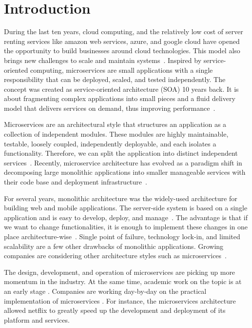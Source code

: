 
\section{Introduction}

During the last ten years, cloud computing, and the relatively low cost of server renting services like amazon web services, azure, and google cloud have opened the opportunity to build businesses around cloud technologies. This model also brings new challenges to scale and maintain systems~\cite{Claus2016}. Inspired by service-oriented computing, microservices are small applications with a single responsibility that can be deployed, scaled, and tested independently. The concept was created as service-oriented architecture (SOA) 10 years back. It is about fragmenting complex applications into small pieces and a fluid delivery model that delivers services on demand, thus improving performance~\cite{Larrucea2018}.

Microservices are an architectural style that structures an application as a collection of independent modules. These modules are highly maintainable, testable, loosely coupled, independently deployable, and each isolates a functionality. Therefore, we can split the application into distinct independent services~\cite{thones2015}. Recently, microservice architecture has evolved as a paradigm shift in decomposing large monolithic applications into smaller manageable services with their code base and deployment infrastructure~\cite{Taibi2019}. %

For several years, monolithic architecture was the widely-used architecture for building web and mobile applications. The server-side system is based on a single application and is easy to develop, deploy, and manage~\cite{Danbettinger2019}. The advantage is that if we want to change functionalities, it is enough to implement these changes in one place architecture-wise~\cite{Pavlovic2020}. Single point of failure, technology lock-in, and limited scalability are a few other drawbacks of monolithic applications. Growing companies are considering other architecture styles such as microservices~\cite{Lenga2019, Jag2017, Rodrigue2016}.

The design, development, and operation of microservices are picking up more momentum in the industry. At the same time, academic work on the topic is at an early stage \cite{Soldani2018, Dragoni2017, Olaf2016}. 
Companies are working day-by-day on the practical implementation of microservices \cite{Kevin2015, Alpers2015}. For instance, the microservices architecture allowed netflix \cite{Meshenberg2016} to greatly speed up the development and deployment of its platform and services.

